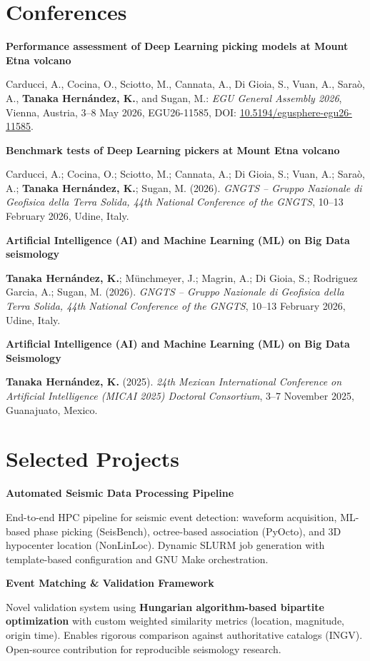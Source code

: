 \documentclass[10pt,a4paper]{article}
\newcommand{\cvproject}[2]{%
  \vspace{2pt}%
  {\bfseries\color{ink}#1}\par
  \smallskip
  {\color{muted}#2}\par
}
\begin{document}
\newpage
\section*{Conferences}
\cvproject{Performance assessment of Deep Learning picking models at Mount Etna
volcano}{Carducci, A., Cocina, O., Sciotto, M., Cannata, A., Di Gioia, S.,
  Vuan, A., Saraò, A., \textbf{Tanaka Hernández, K.}, and Sugan, M.:
  \textit{EGU General Assembly 2026}, Vienna, Austria, 3--8 May 2026,
  EGU26-11585, DOI:
\href{https://doi.org/10.5194/egusphere-egu26-11585}{10.5194/egusphere-egu26-11585}.}

\cvproject{Benchmark tests of Deep Learning pickers at Mount Etna volcano}
{Carducci, A.; Cocina, O.; Sciotto, M.; Cannata, A.; Di Gioia, S.; Vuan, A.;
  Saraò, A.; \textbf{Tanaka Hernández, K.}; Sugan, M. (2026).
  \textit{GNGTS -- Gruppo Nazionale di Geofisica della Terra Solida, 44th
National Conference of the GNGTS}, 10--13 February 2026, Udine, Italy.}

\cvproject{Artificial Intelligence (AI) and Machine Learning (ML) on Big Data
seismology}{\textbf{Tanaka Hernández, K.}; Münchmeyer, J.; Magrin, A.;
  Di Gioia, S.; Rodriguez Garcia, A.; Sugan, M. (2026).
  \textit{GNGTS -- Gruppo Nazionale di Geofisica della Terra Solida,
44th National Conference of the GNGTS}, 10--13 February 2026, Udine, Italy.}

\cvproject{Artificial Intelligence (AI) and Machine Learning (ML) on Big Data
Seismology}{\textbf{Tanaka Hernández, K.} (2025).
  \textit{24th Mexican International Conference on Artificial Intelligence
(MICAI 2025) Doctoral Consortium}, 3--7 November 2025, Guanajuato, Mexico.}

\section*{Selected Projects}
\cvproject{Automated Seismic Data Processing Pipeline}{End-to-end HPC pipeline
  for seismic event detection: waveform acquisition, ML-based phase picking
  (SeisBench), octree-based association (PyOcto), and 3D hypocenter location
  (NonLinLoc). Dynamic SLURM job generation with template-based configuration
  and GNU Make orchestration.
}

\cvproject{Event Matching \& Validation Framework}{
  Novel validation system using \textbf{Hungarian algorithm-based bipartite
  optimization} with custom weighted similarity metrics
  (location, magnitude, origin time). Enables rigorous comparison
  against authoritative catalogs (INGV).
  Open-source contribution for reproducible seismology research.
}
\end{document}
